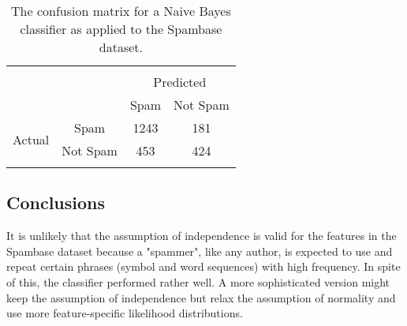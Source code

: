 \documentclass[12pt]{article}
\begin{document}
\begin{table}[!htbp] \centering 
  \caption{The confusion matrix for a Naive Bayes classifier as applied to the Spambase dataset.} 
  \label{} 
\begin{tabular}{lccc} 
\\[-1.8ex]\hline 
\hline \\[-1.8ex] 
\multicolumn{2}{c}{} & \multicolumn{2}{c}{Predicted} \\
\multicolumn{2}{c}{} & Spam & Not Spam\\
\multirow{2}{*}{Actual} & Spam & 1243 & 181\\
& Not Spam & 453 & 424\\
\hline \\[-1.8ex]
\end{tabular} 
\end{table}

\subsection{Conclusions}
It is unlikely that the assumption of independence is valid for the features in the Spambase dataset because a "spammer", like any author, is expected to use and repeat certain phrases (symbol and word sequences) with high frequency. In spite of this, the classifier performed rather well. A more sophisticated version might keep the assumption of independence but relax the assumption of normality and use more feature-specific likelihood distributions. 


%
%
\end{document}

